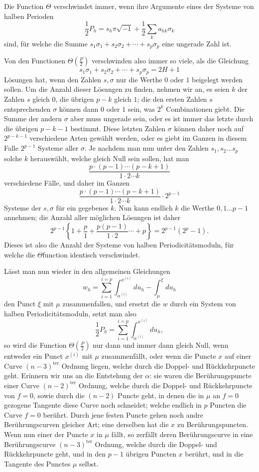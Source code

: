 \documentclass[10pt]{article}
\begin{document}
Die Function \(\Theta\) verschwindet immer, wenn ihre Argumente eines der Systeme von halben Perioden
\[
\frac12P_h=s_h\pi\sqrt{-1}+\frac12\sum_k a_{hk}\sigma_k
\]
sind, für welche die Summe \(s_1\sigma_1+s_2\sigma_2+\cdots+s_p\sigma_p\) eine ungerade Zahl ist.

Von den Functionen \(\Theta\left(\frac P2\right)\) verschwinden also immer so viele, als die Gleichung
\[
s_1\sigma_1+s_2\sigma_2+\cdots+s_p\sigma_p=2H+1
\]
Lösungen hat, wenn den Zahlen \(s,\sigma\) nur die Werthe \(0\) oder \(1\) beigelegt werden sollen. Um die Anzahl dieser Lösungen zu finden, nehmen wir an, es seien \(k\) der Zahlen \(s\) gleich \(0\), die übrigen \(p-k\) gleich \(1\); die den ersten Zahlen \(s\) entsprechenden \(\sigma\) können dann \(0\) oder \(1\) sein, was \(2^k\) Combinationen giebt. Die Summe der andern \(\sigma\) aber muss ungerade sein, oder es ist immer das letzte durch die übrigen \(p-k-1\) bestimmt. Diese letzten Zahlen \(\sigma\) können daher noch auf \(2^{p-k-1}\) verschiedene Arten gewählt werden, oder es giebt im Ganzen in diesem Falle \(2^{p-1}\) Systeme aller \(\sigma\). Je nachdem man nun unter den Zahlen \(s_1,s_2\ldots s_p\) solche \(k\) herauswählt, welche gleich Null sein sollen, hat man
\[
\frac{p\cdot(p-1)\cdots(p-k+1)}{1\cdot2\cdots k}
\]
verschiedene Fälle, und daher im Ganzen
\[
\frac{p\cdot(p-1)\cdots(p-k+1)}{1\cdot2\cdots k}\cdot2^{p-1}
\]
Systeme der \(s,\sigma\) für ein gegebenes \(k\). Nun kann endlich \(k\) die Werthe \(0,1\ldots p-1\) annehmen; die Anzahl aller möglichen Lösungen ist daher
\[
2^{p-1}\left\{1+\frac p1+\frac{p(p-1)}{1\cdot2}\cdots+p\right\}
=2^{p-1}(2^p-1).
\]
Dieses ist also die Anzahl der Systeme von halben Periodicitätsmoduln, für welche die \(\Theta\)function identisch verschwindet.

Lässt man nun wieder in den allgemeinen Gleichungen
\[
w_h=\sum_{i=1}^{i=p}\int_{\alpha^{(i)}}^{x^{(i)}}du_h-\int_{\mu}^{\xi}du_h
\]
den Punct \(\xi\) mit \(\mu\) zusammenfallen, und ersetzt die \(w\) durch ein System von halben Periodicitätsmoduln, setzt man also
\[
\frac12P_h=\sum_{i=1}^{i=p}\int_{\alpha^{(i)}}^{x^{(i)}}du_h,
\]
so wird die Function \(\Theta\left(\frac P2\right)\) nur dann und immer dann gleich Null, wenn entweder ein Punct \(x^{(i)}\) mit \(\mu\) zusammenfällt, oder wenn die Puncte \(x\) auf einer Curve \((n-3)^{\text{ter}}\) Ordnung liegen, welche durch die Doppel- und Rückkehrpuncte geht. Erinnern wir uns an die Entstehung der \(\alpha\): sie waren die Berührungspuncte einer Curve \((n-2)^{\text{ter}}\) Ordnung, welche durch die Doppel- und Rückkehrpuncte von \(f=0\), sowie durch die \((n-2)\) Puncte geht, in denen die in \(\mu\) an \(f=0\) gezogene Tangente diese Curve noch schneidet; welche endlich in \(p\) Puncten die Curve \(f=0\) berührt. Durch jene festen Puncte gehen noch andre Berührungscurven gleicher Art; eine derselben hat die \(x\) zu Berührungspuncten. Wenn nun einer der Puncte \(x\) in \(\mu\) fällt, so zerfällt deren Berührungscurve in eine Berührungscurve \((n-3)^{\text{ter}}\) Ordnung, welche durch die Doppel- und Rückkehrpuncte geht, und in den \(p-1\) übrigen Puncten \(x\) berührt, und in die Tangente des Punctes \(\mu\) selbst.
\end{document}
